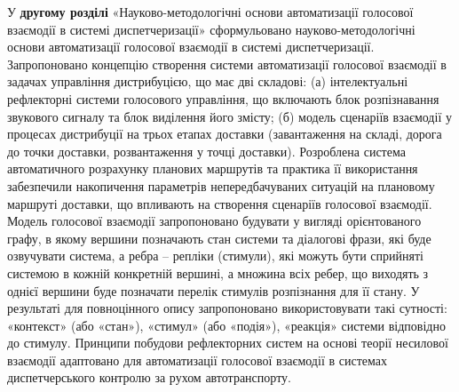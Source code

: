 У \textbf{другому розділі} «Науково-методологічні основи автоматизації голосової взаємодії в системі диспетчеризації» сформульовано науково-методологічні основи автоматизації голосової взаємодії в системі диспетчеризації. 
Запропоновано концепцію створення системи автоматизації голосової взаємодії в задачах управління дистрибуцією, що має дві складові: (а) інтелектуальні рефлекторні системи голосового управління, що включають блок розпізнавання звукового сигналу та блок виділення його змісту; (б) модель сценаріїв взаємодії у процесах дистрибуції на трьох етапах доставки (завантаження на складі, дорога до точки доставки, розвантаження у точці доставки).
Розроблена система автоматичного розрахунку планових маршрутів та практика її використання забезпечили накопичення параметрів непередбачуваних ситуацій на плановому маршруті доставки, що впливають на створення сценаріїв голосової взаємодії.
Модель голосової взаємодії запропоновано будувати у вигляді орієнтованого графу, в якому вершини позначають стан системи та діалогові фрази, які буде озвучувати система, а ребра – репліки (стимули), які можуть бути сприйняті системою в кожній конкретній вершині, а множина всіх ребер, що виходять з однієї вершини буде позначати перелік стимулів розпізнання для її стану. У результаті для повноцінного опису запропоновано використовувати такі сутності: «контекст» (або «стан»), «стимул» (або «подія»), «реакція» системи відповідно до стимулу.
Принципи побудови рефлекторних систем на основі теорії несилової взаємодії адаптовано для автоматизації голосової взаємодії в системах диспетчерського контролю за рухом автотранспорту.


